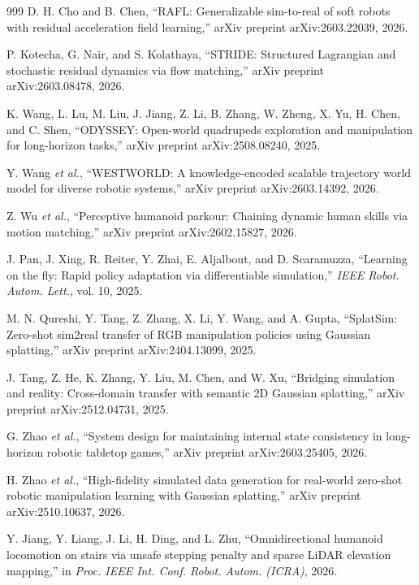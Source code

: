 ﻿\documentclass[11pt,a4paper]{article}
\begin{document}
\begin{thebibliography}{999}
D. H. Cho and B. Chen, ``{RAFL}: Generalizable sim-to-real of soft robots with residual acceleration field learning,'' arXiv preprint arXiv:2603.22039, 2026.

P. Kotecha, G. Nair, and S. Kolathaya, ``{STRIDE}: Structured Lagrangian and stochastic residual dynamics via flow matching,'' arXiv preprint arXiv:2603.08478, 2026.

K. Wang, L. Lu, M. Liu, J. Jiang, Z. Li, B. Zhang, W. Zheng, X. Yu, H. Chen, and C. Shen, ``{ODYSSEY}: Open-world quadrupeds exploration and manipulation for long-horizon tasks,'' arXiv preprint arXiv:2508.08240, 2025.

Y. Wang \textit{et al.}, ``{WESTWORLD}: A knowledge-encoded scalable trajectory world model for diverse robotic systems,'' arXiv preprint arXiv:2603.14392, 2026.

Z. Wu \textit{et al.}, ``Perceptive humanoid parkour: Chaining dynamic human skills via motion matching,'' arXiv preprint arXiv:2602.15827, 2026.

J. Pan, J. Xing, R. Reiter, Y. Zhai, E. Aljalbout, and D. Scaramuzza, ``Learning on the fly: Rapid policy adaptation via differentiable simulation,'' \textit{IEEE Robot. Autom. Lett.}, vol. 10, 2025.

M. N. Qureshi, Y. Tang, Z. Zhang, X. Li, Y. Wang, and A. Gupta, ``{SplatSim}: Zero-shot sim2real transfer of {RGB} manipulation policies using Gaussian splatting,'' arXiv preprint arXiv:2404.13099, 2025.

J. Tang, Z. He, K. Zhang, Y. Liu, M. Chen, and W. Xu, ``Bridging simulation and reality: Cross-domain transfer with semantic 2D Gaussian splatting,'' arXiv preprint arXiv:2512.04731, 2025.

G. Zhao \textit{et al.}, ``System design for maintaining internal state consistency in long-horizon robotic tabletop games,'' arXiv preprint arXiv:2603.25405, 2026.

H. Zhao \textit{et al.}, ``High-fidelity simulated data generation for real-world zero-shot robotic manipulation learning with Gaussian splatting,'' arXiv preprint arXiv:2510.10637, 2026.

Y. Jiang, Y. Liang, J. Li, H. Ding, and L. Zhu, ``Omnidirectional humanoid locomotion on stairs via unsafe stepping penalty and sparse LiDAR elevation mapping,'' in \textit{Proc. IEEE Int. Conf. Robot. Autom. (ICRA)}, 2026.


\end{thebibliography}
\end{document}
